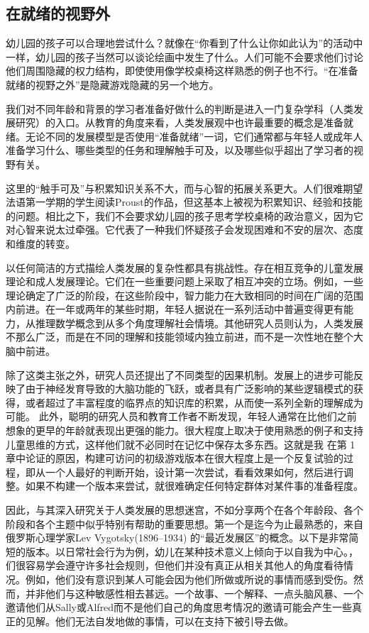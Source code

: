 \subsection*{在就绪的视野外}

幼儿园的孩子可以合理地尝试什么？就像在“你看到了什么让你如此认为”的活动中一样，幼儿园的孩子当然可以谈论绘画中发生了什么。人们可能不会要求他们讨论他们周围隐藏的权力结构，即使使用像学校桌椅这样熟悉的例子也不行。“在准备就绪的视野之外”是隐藏游戏隐藏的另一个地方。

我们对不同年龄和背景的学习者准备好做什么的判断是进入一门复杂学科（人类发展研究）的入口。从教育的角度来看，人类发展观中也许最重要的概念是准备就绪。无论不同的发展模型是否使用“准备就绪”一词，它们通常都与年轻人或成年人准备学习什么、哪些类型的任务和理解触手可及，以及哪些似乎超出了学习者的视野有关。

这里的“触手可及”与积累知识关系不大，而与心智的拓展关系更大。人们很难期望法语第一学期的学生阅读Proust的作品，但这基本上被视为积累知识、经验和技能的问题。相比之下，我们不会要求幼儿园的孩子思考学校桌椅的政治意义，因为它对心智来说太过牵强。它代表了一种我们怀疑孩子会发现困难和不安的层次、态度和维度的转变。

以任何简洁的方式描绘人类发展的复杂性都具有挑战性。存在相互竞争的儿童发展理论和成人发展理论。它们在一些重要问题上采取了相互冲突的立场。例如，一些理论确定了广泛的阶段，在这些阶段中，智力能力在大致相同的时间在广阔的范围内前进。在一年或两年的某些时期，年轻人据说在一系列活动中普遍变得更有能力，从推理数学概念到从多个角度理解社会情境。其他研究人员则认为，人类发展不那么广泛，而是在不同的理解和技能领域内独立前进，而不是一次性地在整个大脑中前进。

除了这类主张之外，研究人员还提出了不同类型的因果机制。发展上的进步可能反映了由于神经发育导致的大脑功能的飞跃，或者具有广泛影响的某些逻辑模式的获得，或者超过了丰富程度的临界点的知识库的积累，从而使一系列全新的理解成为可能。
此外，聪明的研究人员和教育工作者不断发现，年轻人通常在比他们之前想象的更早的年龄就表现出更强的能力。很大程度上取决于使用熟悉的例子和支持儿童思维的方式，这样他们就不必同时在记忆中保存太多东西。这就是我 在第 1 章中论证的原因，构建可访问的初级游戏版本在很大程度上是一个反复试验的过程，即从一个人最好的判断开始，设计第一次尝试，看看效果如何，然后进行调整。如果不构建一个版本来尝试，就很难确定任何特定群体对某件事的准备程度。

因此，与其深入研究关于人类发展的思想迷宫，不如分享两个在各个年龄段、各个阶段和各个主题中似乎特别有帮助的重要思想。第一个是迄今为止最熟悉的，来自俄罗斯心理学家Lev Vygotsky(1896–1934) 的“最近发展区”的概念。以下是非常简短的版本。以日常社会行为为例，幼儿在某种技术意义上倾向于以自我为中心。，们很容易学会遵守许多社会规则，但他们并没有真正从相关其他人的角度看待情况。例如，他们没有意识到某人可能会因为他们所做或所说的事情而感到受伤。然而，并非他们与这种敏感性相去甚远。一个故事、一个解释、一点头脑风暴、一个邀请他们从Sally或Alfred而不是他们自己的角度思考情况的邀请可能会产生一些真正的见解。他们无法自发地做的事情，可以在支持下被引导去做。

